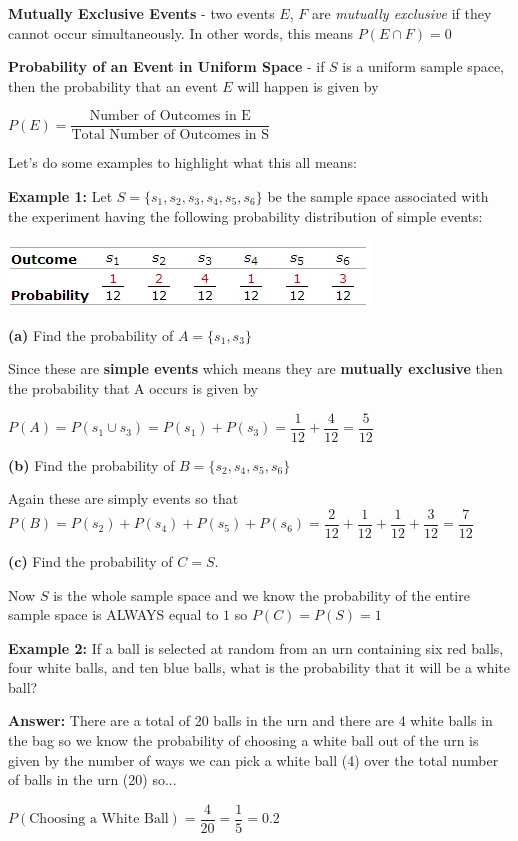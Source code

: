\documentclass[12pt]{article}
\newenvironment{myindentpar}[1]%
     {\begin{list}{}%
             {\setlength{\leftmargin}{#1}}%
             \item[]%
     }
     {\end{list}}
\begin{document}
\vspace{1cm}
\textbf{Mutually Exclusive Events} - two events $E$, $F$ are \textit{mutually exclusive} if they cannot occur simultaneously. In other words, this means $P(E \cap F) = 0$


\textbf{Probability of an Event in Uniform Space} - if $S$  is a uniform sample space, then the probability that an event $E$ will happen is given by
\newline

\centerline{$P(E) = \dfrac{\text{Number of Outcomes in E}}{\text{Total Number of Outcomes in S}}$}
\vspace{.5cm}

Let's do some examples to highlight what this all means:
\begin{myindentpar}{1cm}
\textbf{Example 1:} Let $S = \{s_{1}, s_{2}, s_{3}, s_{4}, s_{5}, s_{6}\}$ be the sample space associated with the experiment having the following probability distribution of simple events:

\centerline{\includegraphics{ProbDistribution.jpg}}
\begin{myindentpar}{1cm}
\textbf{(a)} Find the probability of $A = \{s_1, s_3\}$

Since these are \textbf{simple events} which means they are \textbf{mutually exclusive} then the probability that A occurs is given by

$P(A) = P(s_1 \cup s_3) = P(s_1) + P(s_3) = \dfrac{1}{12} + \dfrac{4}{12} = \dfrac{5}{12}$

\textbf{(b)} Find the probability of $B = \{s_2, s_4, s_5, s_6\}$

Again these are simply events so that $P(B) = P(s_2) + P(s_4) + P(s_5) + P(s_6) = \dfrac{2}{12} + \dfrac{1}{12} + \dfrac{1}{12} + \dfrac{3}{12} = \dfrac{7}{12}$

\textbf{(c)} Find the probability of $C = S$.

Now $S$ is the whole sample space and we know the probability of the entire sample space is ALWAYS equal to $1$ so $P(C) = P(S) = 1$
\end{myindentpar}

\textbf{Example 2:} If a ball is selected at random from an urn containing six red balls, four white balls, and ten blue balls, what is the probability that it will be a white ball? 
\begin{myindentpar}{1cm}
\textbf{Answer:} There are a total of 20 balls in the urn and there are 4 white balls in the bag so we know the probability of choosing a white ball out of the urn is given by the number of ways we can pick a white ball (4) over the total number of balls in the urn (20) so...

$P(\text{Choosing a White Ball})  = \dfrac{4}{20} = \dfrac{1}{5} = 0.2$
\end{myindentpar}
\end{myindentpar}
\end{document}
